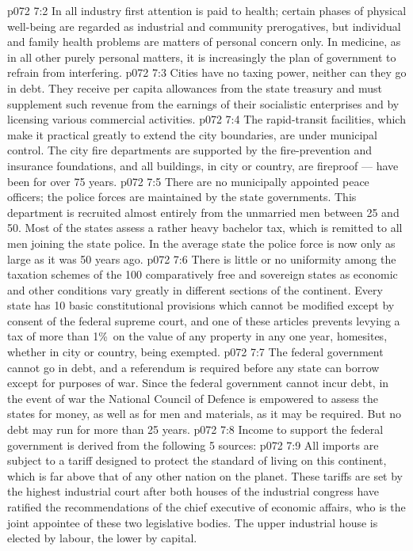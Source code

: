 \vs p072 7:2 In all industry first attention is paid to health; certain phases of physical well\hyp{}being are regarded as industrial and community prerogatives, but individual and family health problems are matters of personal concern only. In medicine, as in all other purely personal matters, it is increasingly the plan of government to refrain from interfering.
\vs p072 7:3 \pc Cities have no taxing power, neither can they go in debt. They receive per capita allowances from the state treasury and must supplement such revenue from the earnings of their socialistic enterprises and by licensing various commercial activities.
\vs p072 7:4 The rapid\hyp{}transit facilities, which make it practical greatly to extend the city boundaries, are under municipal control. The city fire departments are supported by the fire\hyp{}prevention and insurance foundations, and all buildings, in city or country, are fireproof --- have been for over 75 years.
\vs p072 7:5 There are no municipally appointed peace officers; the police forces are maintained by the state governments. This department is recruited almost entirely from the unmarried men between 25 and 50. Most of the states assess a rather heavy bachelor tax, which is remitted to all men joining the state police. In the average state the police force is now only  as large as it was 50 years ago.
\vs p072 7:6 \pc There is little or no uniformity among the taxation schemes of the 100 comparatively free and sovereign states as economic and other conditions vary greatly in different sections of the continent. Every state has 10 basic constitutional provisions which cannot be modified except by consent of the federal supreme court, and one of these articles prevents levying a tax of more than 1\%\ on the value of any property in any one year, homesites, whether in city or country, being exempted.
\vs p072 7:7 The federal government cannot go in debt, and a  referendum is required before any state can borrow except for purposes of war. Since the federal government cannot incur debt, in the event of war the National Council of Defence is empowered to assess the states for money, as well as for men and materials, as it may be required. But no debt may run for more than 25 years.
\vs p072 7:8 \pc Income to support the federal government is derived from the following 5 sources:
\vs p072 7:9 \bibnobreakspace {} All imports are subject to a tariff designed to protect the standard of living on this continent, which is far above that of any other nation on the planet. These tariffs are set by the highest industrial court after both houses of the industrial congress have ratified the recommendations of the chief executive of economic affairs, who is the joint appointee of these two legislative bodies. The upper industrial house is elected by labour, the lower by capital.
